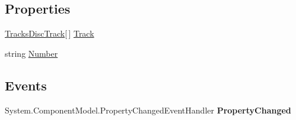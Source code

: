 \subsection*{Properties}
\begin{DoxyCompactItemize}
\item 
\hypertarget{class_price___comparison_1_1amazon_1_1ecs_1_1_tracks_disc_abd64d2d78ae28e2f20954a319946a762}{\hyperlink{class_price___comparison_1_1amazon_1_1ecs_1_1_tracks_disc_track}{Tracks\-Disc\-Track}\mbox{[}$\,$\mbox{]} \hyperlink{class_price___comparison_1_1amazon_1_1ecs_1_1_tracks_disc_abd64d2d78ae28e2f20954a319946a762}{Track}}\label{class_price___comparison_1_1amazon_1_1ecs_1_1_tracks_disc_abd64d2d78ae28e2f20954a319946a762}

\begin{DoxyCompactList}\small\item\em \end{DoxyCompactList}\item 
\hypertarget{class_price___comparison_1_1amazon_1_1ecs_1_1_tracks_disc_aaf4a872ba3dc416af9f653223ec5e5d3}{string \hyperlink{class_price___comparison_1_1amazon_1_1ecs_1_1_tracks_disc_aaf4a872ba3dc416af9f653223ec5e5d3}{Number}}\label{class_price___comparison_1_1amazon_1_1ecs_1_1_tracks_disc_aaf4a872ba3dc416af9f653223ec5e5d3}

\begin{DoxyCompactList}\small\item\em \end{DoxyCompactList}\end{DoxyCompactItemize}
\subsection*{Events}
\begin{DoxyCompactItemize}
\item 
\hypertarget{class_price___comparison_1_1amazon_1_1ecs_1_1_tracks_disc_a909aff0f9f2e98d99b8362c60d4d6f0e}{System.\-Component\-Model.\-Property\-Changed\-Event\-Handler {\bfseries Property\-Changed}}\label{class_price___comparison_1_1amazon_1_1ecs_1_1_tracks_disc_a909aff0f9f2e98d99b8362c60d4d6f0e}

\end{DoxyCompactItemize}
